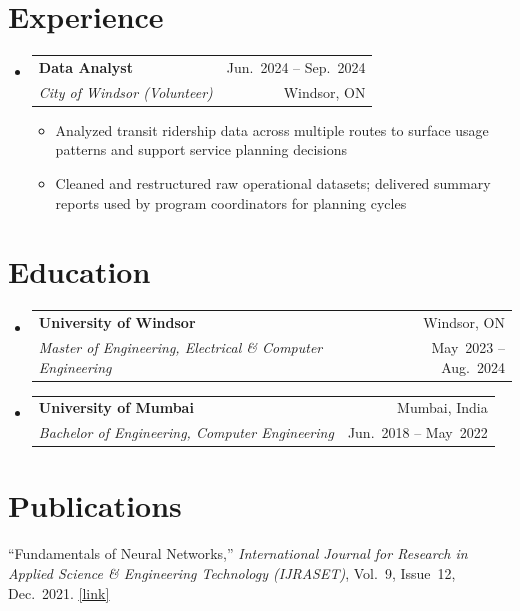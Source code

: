 \documentclass[letterpaper,11pt]{article}
\makeatletter
\newcommand{\resumeItem}[1]{
  \item\small{
    {#1 \vspace{-2pt}}
  }
}
\newcommand{\resumeSubheading}[4]{
  \vspace{-2pt}\item
    \begin{tabular*}{0.97\textwidth}[t]{l@{\extracolsep{\fill}}r}
      \textbf{#1} & \small #2 \\
      \textit{\small#3} & \small #4 \\
    \end{tabular*}\vspace{-7pt}
}
\newcommand{\resumeSubHeadingListStart}{\begin{itemize}[leftmargin=0.15in, label={}]}
\newcommand{\resumeSubHeadingListEnd}{\end{itemize}}
\newcommand{\resumeItemListStart}{\begin{itemize}}
\newcommand{\resumeItemListEnd}{\end{itemize}\vspace{-5pt}}
\makeatother
\begin{document}
\section{Experience}
  \resumeSubHeadingListStart
    \resumeSubheading
      {Data Analyst}{Jun.~2024 -- Sep.~2024}
      {City of Windsor (Volunteer)}{Windsor, ON}
      \resumeItemListStart
        \resumeItem{Analyzed transit ridership data across multiple routes to surface usage patterns
        and support service planning decisions}
        \resumeItem{Cleaned and restructured raw operational datasets; delivered summary reports
        used by program coordinators for planning cycles}
      \resumeItemListEnd
  \resumeSubHeadingListEnd
\section{Education}
  \resumeSubHeadingListStart
    \resumeSubheading
      {University of Windsor}{Windsor, ON}
      {Master of Engineering, Electrical \& Computer Engineering}{May~2023 -- Aug.~2024}
    \resumeSubheading
      {University of Mumbai}{Mumbai, India}
      {Bachelor of Engineering, Computer Engineering}{Jun.~2018 -- May~2022}
  \resumeSubHeadingListEnd
\section{Publications}
 \begin{itemize}[leftmargin=0.15in, label={}]
    \small{\item{
      ``Fundamentals of Neural Networks,''
      \textit{International Journal for Research in Applied Science \& Engineering Technology (IJRASET)},
      Vol.~9, Issue~12, Dec.~2021.
      \href{https://www.researchgate.net/profile/Amey-Thakur/publication/353827517_Fundamentals_of_Neural_Networks/links/6113d8be1ca20f6f8616cf5d/Fundamentals-of-Neural-Networks.pdf}{\underline{[link]}}
    }}
 \end{itemize}
\end{document}
